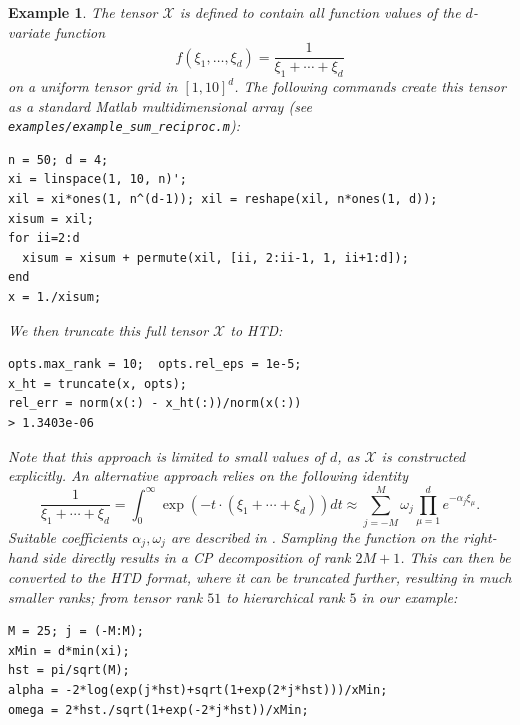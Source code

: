 \documentclass[11pt, a4paper]{article}
\newcommand{\calX}{\mathcal{X}}
\newtheorem{example}[theorem]{\bf Example}
\begin{document}
\begin{example} \rm \label{example:sum_reciproc}
The tensor $\calX$ is defined to contain all function values of the $d$-variate
function
\[
f(\xi_1, \ldots, \xi_d) = \frac{1}{\xi_1 + \cdots + \xi_d}
\]
on a uniform tensor grid in $[1,10]^d$.
The following commands create this tensor as a standard {\sc Matlab}
multidimensional array (see \texttt{examples/example\_sum\_reciproc.m}):
\begin{framed} \small
\noindent
\vspace{-3ex}
\begin{verbatim}
n = 50; d = 4;
xi = linspace(1, 10, n)';
xil = xi*ones(1, n^(d-1)); xil = reshape(xil, n*ones(1, d));
xisum = xil;
for ii=2:d
  xisum = xisum + permute(xil, [ii, 2:ii-1, 1, ii+1:d]);
end
x = 1./xisum;
\end{verbatim}\vspace{-2ex}
\end{framed}
\noindent We then truncate this full tensor $\calX$ to HTD:
\begin{framed}\small \noindent 
\vspace{-3ex} 
\begin{verbatim}
opts.max_rank = 10;  opts.rel_eps = 1e-5;
x_ht = truncate(x, opts);
rel_err = norm(x(:) - x_ht(:))/norm(x(:))
> 1.3403e-06
\end{verbatim}\vspace{-2ex}
\end{framed}
\noindent Note that this approach is limited to small values of $d$, as
$\calX$ is constructed explicitly. An alternative approach relies on the
following identity
\[
\frac{1}{\xi_1+\cdots+\xi_d} 
= \int_0^\infty \exp(-t\cdot(\xi_1+\cdots+\xi_d)) dt 
\approx \sum_{j=-M}^M \omega_j \prod_{\mu=1}^d e^{-\alpha_j \xi_\mu}.
\]
Suitable coefficients $\alpha_j, \omega_j$ are described in \cite{Gra04a,Hac08}.
Sampling the function on the right-hand side directly results in a CP decomposition of rank
$2M+1$. This can then be converted to the HTD format, where it can be
truncated further, resulting in much smaller ranks; from tensor rank $51$ to
hierarchical rank $5$ in our example:
\begin{framed}\small \noindent \vspace{-3ex} 
\begin{verbatim}
M = 25; j = (-M:M);
xMin = d*min(xi);
hst = pi/sqrt(M);
alpha = -2*log(exp(j*hst)+sqrt(1+exp(2*j*hst)))/xMin;
omega = 2*hst./sqrt(1+exp(-2*j*hst))/xMin;


\end{verbatim}
\end{framed}
\end{example}
\end{document}
